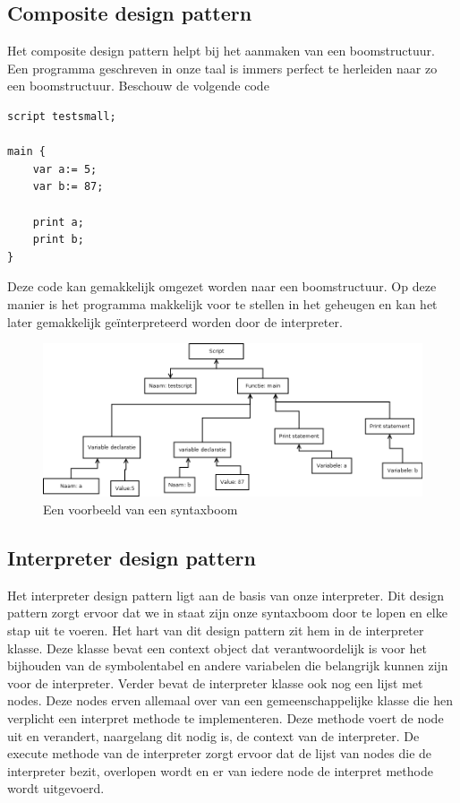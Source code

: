\documentclass[11pt,a4paper]{article}
\begin{document}
\subsection{Composite design pattern}
Het composite design pattern helpt bij het aanmaken van een boomstructuur. Een programma geschreven in onze taal is immers perfect te herleiden naar zo een boomstructuur. Beschouw de volgende code

\begin{verbatim}
script testsmall;

main {
	var a:= 5;
	var b:= 87;
	
	print a;
	print b;
}

\end{verbatim}
Deze code kan gemakkelijk omgezet worden naar een boomstructuur. Op deze manier is het programma makkelijk voor te stellen in het geheugen en kan het later gemakkelijk geïnterpreteerd worden door de interpreter.
\begin{figure}[ht]
\centering
\includegraphics[width=\textwidth]{afbeeldingen/testsmall_tree}
\caption{Een voorbeeld van een syntaxboom}
\end{figure}

\subsection{Interpreter design pattern}
Het interpreter design pattern ligt aan de basis van onze interpreter. Dit design pattern zorgt ervoor dat we in staat zijn onze syntaxboom door te lopen en elke stap uit te voeren. Het hart van dit design pattern zit hem in de interpreter klasse. Deze klasse bevat een context object dat verantwoordelijk is voor het bijhouden van de symbolentabel en andere variabelen die belangrijk kunnen zijn voor de interpreter. Verder bevat de interpreter klasse ook nog een lijst met nodes. Deze nodes erven allemaal over van een gemeenschappelijke klasse die hen verplicht een interpret methode te implementeren. Deze methode voert de node uit en verandert, naargelang dit nodig is, de context van de interpreter. De execute methode van de interpreter zorgt ervoor dat de lijst van nodes die de interpreter bezit, overlopen wordt en er van iedere node de interpret methode wordt uitgevoerd.
\end{document}

